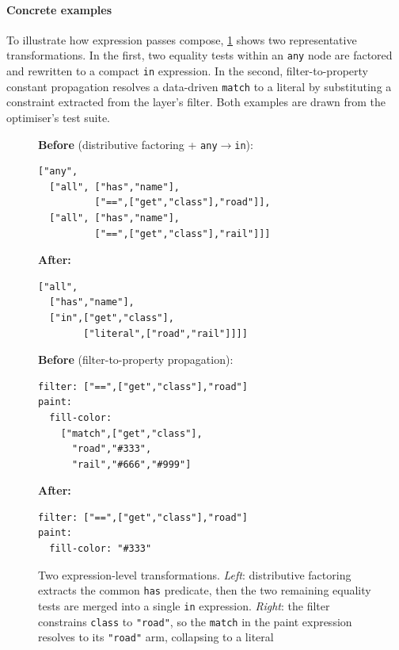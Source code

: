 \paragraph{Concrete examples}
To illustrate how expression passes compose, \cref{fig:expr_before_after} shows two representative transformations.
In the first, two equality tests within an \texttt{any} node are factored and rewritten to a compact \texttt{in} expression.
In the second, filter-to-property constant propagation resolves a data-driven \texttt{match} to a literal by substituting a constraint extracted from the layer's filter.
Both examples are drawn from the optimiser's test suite.

\begin{figure}[htbp]
\centering
\begin{minipage}[t]{0.48\linewidth}
\textbf{Before} (distributive factoring + \texttt{any}$\to$\texttt{in}):\par\smallskip
\begin{lstlisting}[language={},basicstyle=\ttfamily\scriptsize,frame=single]
["any",
  ["all", ["has","name"],
          ["==",["get","class"],"road"]],
  ["all", ["has","name"],
          ["==",["get","class"],"rail"]]]
\end{lstlisting}
\textbf{After:}\par\smallskip
\begin{lstlisting}[language={},basicstyle=\ttfamily\scriptsize,frame=single]
["all",
  ["has","name"],
  ["in",["get","class"],
        ["literal",["road","rail"]]]]
\end{lstlisting}
\end{minipage}\hfill
\begin{minipage}[t]{0.48\linewidth}
\textbf{Before} (filter-to-property propagation):\par\smallskip
\begin{lstlisting}[language={},basicstyle=\ttfamily\scriptsize,frame=single]
filter: ["==",["get","class"],"road"]
paint:
  fill-color:
    ["match",["get","class"],
      "road","#333",
      "rail","#666","#999"]
\end{lstlisting}
\textbf{After:}\par\smallskip
\begin{lstlisting}[language={},basicstyle=\ttfamily\scriptsize,frame=single]
filter: ["==",["get","class"],"road"]
paint:
  fill-color: "#333"
\end{lstlisting}
\end{minipage}
\caption{Two expression-level transformations.
\emph{Left}: distributive factoring extracts the common \texttt{has} predicate, then the two remaining equality tests are merged into a single \texttt{in} expression.
\emph{Right}: the filter constrains \texttt{class} to \texttt{"road"}, so the \texttt{match} in the paint expression resolves to its \texttt{"road"} arm, collapsing to a literal}
\label{fig:expr_before_after}
\end{figure}

